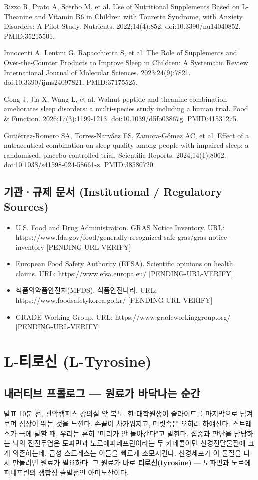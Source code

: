 \documentclass[11pt,oneside]{book}
\newcommand{\refend}{\endgroup\par}
\newcommand{\reff}[2]{\par\hangindent=7mm\hangafter=1\noindent[#1]\hspace{2mm}#2\par}
\begin{document}
\reff{79}{Rizzo R, Prato A, Scerbo M, et al. Use of Nutritional Supplements Based on L-Theanine and Vitamin B6 in Children with Tourette Syndrome, with Anxiety Disorders: A Pilot Study. Nutrients. 2022;14(4):852. doi:10.3390/nu14040852. PMID:35215501.}
\reff{80}{Innocenti A, Lentini G, Rapacchietta S, et al. The Role of Supplements and Over-the-Counter Products to Improve Sleep in Children: A Systematic Review. International Journal of Molecular Sciences. 2023;24(9):7821. doi:10.3390/ijms24097821. PMID:37175525.}
\reff{81}{Gong J, Jia X, Wang L, et al. Walnut peptide and theanine combination ameliorates sleep disorders: a multi-species study including a human trial. Food \& Function. 2026;17(3):1199-1213. doi:10.1039/d5fo03867g. PMID:41531275.}
\reff{82}{Gutiérrez-Romero SA, Torres-Narváez ES, Zamora-Gómez AC, et al. Effect of a nutraceutical combination on sleep quality among people with impaired sleep: a randomised, placebo-controlled trial. Scientific Reports. 2024;14(1):8062. doi:10.1038/s41598-024-58661-z. PMID:38580720.}
\refend
\section{기관·규제 문서 (Institutional / Regulatory Sources)}
\begin{itemize}[leftmargin=6mm,itemsep=1pt,topsep=2pt]
  \item [I1] U.S. Food and Drug Administration. GRAS Notice Inventory. URL: https://www.fda.gov/food/generally-recognized-safe-gras/gras-notice-inventory [PENDING-URL-VERIFY]
  \item [I2] European Food Safety Authority (EFSA). Scientific opinions on health claims. URL: https://www.efsa.europa.eu/ [PENDING-URL-VERIFY]
  \item [I3] 식품의약품안전처(MFDS). 식품안전나라. URL: https://www.foodsafetykorea.go.kr/ [PENDING-URL-VERIFY]
  \item [I4] GRADE Working Group. URL: https://www.gradeworkinggroup.org/ [PENDING-URL-VERIFY]
\end{itemize}


\chapter{L-티로신 (L-Tyrosine)}

\section{내러티브 프롤로그 — 원료가 바닥나는 순간}
발표 10분 전, 관악캠퍼스 강의실 앞 복도. 한 대학원생이 슬라이드를 마지막으로 넘겨보며 심장이 뛰는 것을 느낀다. 손끝이 차가워지고, 머릿속은 오히려 하얘진다. 스트레스가 극에 달할 때, 우리는 흔히 "머리가 안 돌아간다"고 말한다. 집중과 판단을 담당하는 뇌의 전전두엽은 도파민과 노르에피네프린이라는 두 카테콜아민 신경전달물질에 크게 의존하는데, 급성 스트레스는 이들을 빠르게 소모시킨다. 신경세포가 이 물질을 다시 만들려면 원료가 필요하다. 그 원료가 바로 \textbf{티로신(tyrosine)} — 도파민과 노르에피네프린의 생합성 출발점인 아미노산이다.
\end{document}
